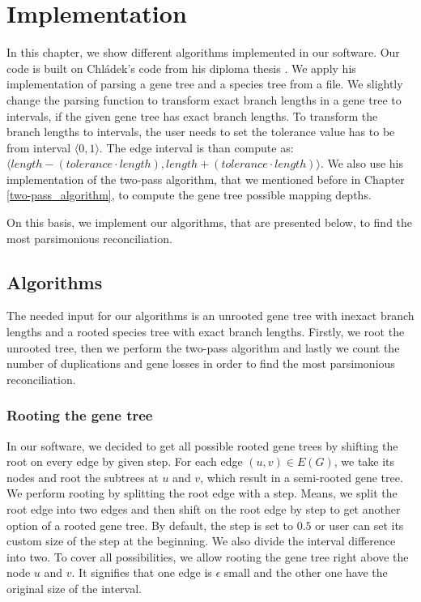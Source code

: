 \chapter{Implementation}

In this chapter, we show different algorithms implemented in our software. Our code is built on Chládek's code from his diploma thesis \cite{chladek_thesis}. We apply his implementation of parsing a gene tree and a species tree from a file. We slightly change the parsing function to transform exact branch lengths in a gene tree to intervals, if the given gene tree has exact branch lengths. To transform the branch lengths to intervals, the user needs to set the tolerance value has to be from interval $\langle 0, 1 \rangle$. The edge interval is than compute as: $\langle length - (tolerance \cdot length), length + (tolerance \cdot length) \rangle$. We also use his implementation of the two-pass algorithm, that we mentioned before in Chapter \ref{two-pass_algorithm}, to compute the gene tree possible mapping depths.

On this basis, we implement our algorithms, that are presented below, to find the most parsimonious reconciliation.

\section{Algorithms}

The needed input for our algorithms is an unrooted gene tree with inexact branch lengths and a rooted species tree with exact branch lengths. Firstly, we root the unrooted tree, then we perform the two-pass algorithm \cite{chladek_thesis} and lastly we count the number of duplications and gene losses in order to find the most parsimonious reconciliation.

\subsection{Rooting the gene tree}

In our software, we decided to get all possible rooted gene trees by shifting the root on every edge by given step. For each edge $(u, v) \in E(G)$, we take its nodes and root the subtrees at $u$ and $v$, which result in a semi-rooted gene tree. We perform rooting by splitting the root edge with a step. Means, we split the root edge into two edges and then shift on the root edge by step to get another option of a rooted gene tree. By default, the step is set to $0.5$ or user can set its custom size of the step at the beginning. We also divide the interval difference into two. To cover all possibilities, we allow rooting the gene tree right above the node $u$ and $v$. It signifies that one edge is $\epsilon$ small and the other one have the original size of the interval.

